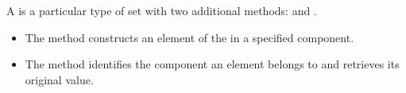 
A \SetDisjointUnion is a particular type of set with two additional methods:  and .
\begin{itemize}
    \item The  method constructs an element of the  in a specified component.
    \item The  method identifies the component an element belongs to and retrieves its original value.
\end{itemize}

\begin{widepar}
\end{widepar}


\begin{widepar}
\end{widepar}
